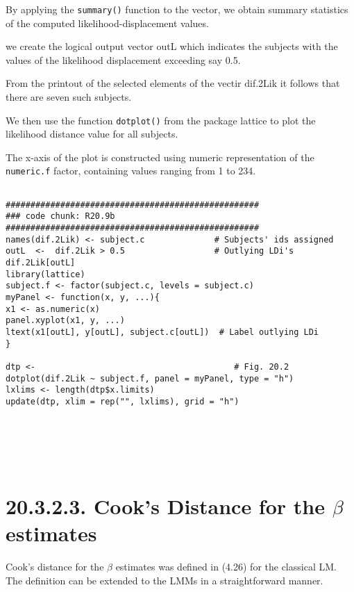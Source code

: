 \documentclass[a4paper,12pt]{article}
\begin{document}
By applying the \texttt{summary()} function to the vector, we obtain summary statistics of the computed likelihood-displacement values.

we create the logical output vector outL which indicates the subjects with the values of the 
likelihood displacement exceeding say 0.5.

From the printout of the selected elements of the vectir dif.2Lik it follows that there are
seven such subjects.


We then use the function \texttt{dotplot()} from the package lattice to plot the 
likelihood distance value for all subjects.

The x-axis of the plot is constructed using numeric representation of the \texttt{numeric.f} factor, containing values ranging from 1 to 234.

\newpage
\begin{framed}
\begin{verbatim}

###################################################
### code chunk: R20.9b
###################################################
names(dif.2Lik) <- subject.c              # Subjects' ids assigned
outL  <-  dif.2Lik > 0.5                  # Outlying LDi's
dif.2Lik[outL]
library(lattice)
subject.f <- factor(subject.c, levels = subject.c)
myPanel <- function(x, y, ...){
x1 <- as.numeric(x)
panel.xyplot(x1, y, ...)
ltext(x1[outL], y[outL], subject.c[outL])  # Label outlying LDi
}

dtp <-                                        # Fig. 20.2
dotplot(dif.2Lik ~ subject.f, panel = myPanel, type = "h")           
lxlims <- length(dtp$x.limits)         
update(dtp, xlim = rep("", lxlims), grid = "h") 






\end{verbatim}	
	
\end{framed}
\section{20.3.2.3. Cook's Distance for the $\beta$ estimates}

Cook's distance for the $\beta$ estimates was defined in (4.26) for the classical LM.
The definition can be extended to the LMMs in a straightforward manner.

\end{document}
